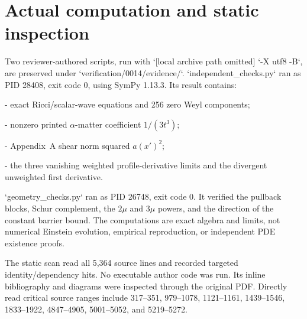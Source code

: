 \documentclass[10pt]{article}
\begin{document}
\section*{Actual computation and static inspection}
Two reviewer-authored scripts, run with `[local archive path omitted] `-X utf8 -B`, are preserved under `verification/0014/evidence/`. `independent\_checks.py` ran as PID 28408, exit code 0, using SymPy 1.13.3. Its result contains:\par
- exact Ricci/scalar-wave equations and 256 zero Weyl components;\par
- nonzero printed \(\alpha\)-matter coefficient \(1/(3t^3)\);\par
- Appendix A shear norm squared \(a(x')^2\);\par
- the three vanishing weighted profile-derivative limits and the divergent unweighted first derivative.\par
`geometry\_checks.py` ran as PID 26748, exit code 0. It verified the pullback blocks, Schur complement, the \(2\mu\) and \(3\mu\) powers, and the direction of the constant barrier bound. The computations are exact algebra and limits, not numerical Einstein evolution, empirical reproduction, or independent PDE existence proofs.\par
The static scan read all 5,364 source lines and recorded targeted identity/dependency hits. No executable author code was run. Its inline bibliography and diagrams were inspected through the original PDF. Directly read critical source ranges include 317–351, 979–1078, 1121–1161, 1439–1546, 1833–1922, 4847–4905, 5001–5052, and 5219–5272.\par
\end{document}
